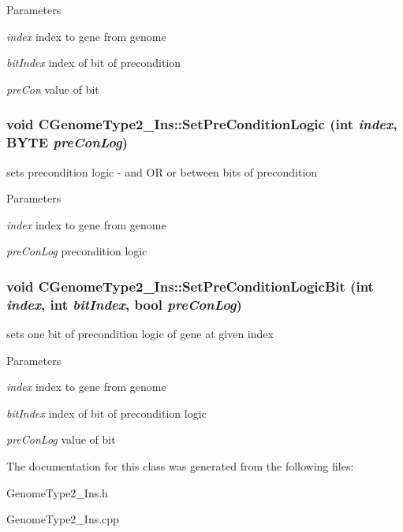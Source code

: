 \begin{DoxyParams}{Parameters}
\item[{\em index}]index to gene from genome \item[{\em bitIndex}]index of bit of precondition \item[{\em preCon}]value of bit \end{DoxyParams}
\hypertarget{classCGenomeType2__Ins_ac474201ad2ab18e57cba38950504518d}{
\subsubsection[{SetPreConditionLogic}]{\setlength{\rightskip}{0pt plus 5cm}void CGenomeType2\_\-Ins::SetPreConditionLogic (int {\em index}, \/  BYTE {\em preConLog})}}
\label{classCGenomeType2__Ins_ac474201ad2ab18e57cba38950504518d}
sets precondition logic -\/ and OR or between bits of precondition


\begin{DoxyParams}{Parameters}
\item[{\em index}]index to gene from genome \item[{\em preConLog}]precondition logic \end{DoxyParams}
\hypertarget{classCGenomeType2__Ins_a397c59c680ddccdbec3b0fd8f6627f3d}{
\subsubsection[{SetPreConditionLogicBit}]{\setlength{\rightskip}{0pt plus 5cm}void CGenomeType2\_\-Ins::SetPreConditionLogicBit (int {\em index}, \/  int {\em bitIndex}, \/  bool {\em preConLog})}}
\label{classCGenomeType2__Ins_a397c59c680ddccdbec3b0fd8f6627f3d}
sets one bit of precondition logic of gene at given index


\begin{DoxyParams}{Parameters}
\item[{\em index}]index to gene from genome \item[{\em bitIndex}]index of bit of precondition logic \item[{\em preConLog}]value of bit \end{DoxyParams}


The documentation for this class was generated from the following files:\begin{DoxyCompactItemize}
\item 
GenomeType2\_\-Ins.h\item 
GenomeType2\_\-Ins.cpp\end{DoxyCompactItemize}
